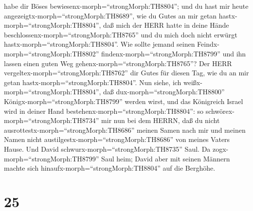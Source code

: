 habe dir Böses bewiesenx-morph=``strongMorph:TH8804'';  und
du hast mir heute angezeigtx-morph=``strongMorph:TH8689'', wie du Gutes
an mir getan hastx-morph=``strongMorph:TH8804'', daß mich der HERR hatte
in deine Hände beschlossenx-morph=``strongMorph:TH8765'' und du mich
doch nicht erwürgt hastx-morph=``strongMorph:TH8804''.  Wie
sollte jemand seinen Feindx-morph=``strongMorph:TH8802''
findenx-morph=``strongMorph:TH8799'' und ihn lassen einen guten Weg
gehenx-morph=``strongMorph:TH8765''? Der HERR
vergeltex-morph=``strongMorph:TH8762'' dir Gutes für diesen Tag, wie du
an mir getan hastx-morph=``strongMorph:TH8804''.  Nun
siehe, ich weißx-morph=``strongMorph:TH8804'', daß
dux-morph=``strongMorph:TH8800'' Königx-morph=``strongMorph:TH8799''
werden wirst, und das Königreich Israel wird in deiner Hand
bestehenx-morph=``strongMorph:TH8804'':  so
schwörex-morph=``strongMorph:TH8734'' mir nun bei dem HERRN, daß du
nicht ausrottestx-morph=``strongMorph:TH8686'' meinen Samen nach mir und
meinen Namen nicht austilgestx-morph=``strongMorph:TH8686'' von meines
Vaters Hause.  Und David
schwurx-morph=``strongMorph:TH8735'' Saul. Da
zogx-morph=``strongMorph:TH8799'' Saul heim; David aber mit seinen
Männern machte sich hinaufx-morph=``strongMorph:TH8804'' auf die
Berghöhe.

\hypertarget{section-24}{%
\section{25}\label{section-24}}

